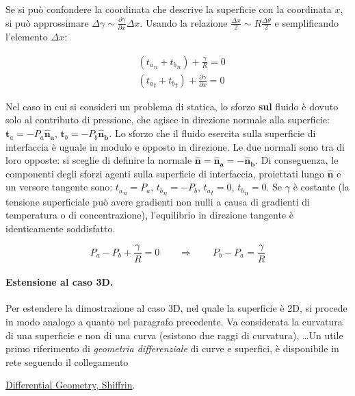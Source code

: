 Se si può confondere la coordinata che descrive la superficie con la coordinata $x$, si può 
approssimare $\Delta \gamma \sim \frac{\partial \gamma}{\partial x} \Delta x$.
Usando la relazione $\frac{\Delta x}{2} \sim R \frac{\Delta \theta}{2}$ e semplificando 
l'elemento $\Delta x$:

\begin{equation}\label{eqn:equil_young_laplace}
\begin{aligned}
 & ( {t_a}_n + {t_b}_n ) + \frac{\gamma}{R} = 0 \\
 & ( {t_a}_t + {t_b}_t ) + \frac{\partial \gamma}{\partial x} = 0
\end{aligned}
\end{equation}

Nel caso in cui si consideri un problema di statica, lo sforzo \textbf{sul} 
 fluido è dovuto solo al contributo di pressione, che agisce in direzione
 normale alla superficie: 
 $\bm{t}_a = -P_a \bm{\hat{n}_a}$,  $\bm{t}_b = -P_b \bm{\hat{n}_b}$. Lo
 sforzo che il fluido esercita sulla superficie di interfaccia è uguale
 in modulo e opposto in direzione. Le due
  normali sono tra di loro opposte: si sceglie di definire la normale
  $\bm{\hat{n}} = \bm{\hat{n}_a} = -\bm{\hat{n}_b}$. Di conseguenza, le
  componenti degli sforzi agenti sulla superficie di interfaccia, proiettati
  lungo $\bm{\hat{n}}$ e un versore tangente sono: ${{t_a}_n} = P_a$, 
  ${{t_b}_n} = - P_b$, ${{t_a}_t} = 0$, ${{t_b}_n} = 0$.
 Se $\gamma$ è costante (la tensione superficiale può avere gradienti non 
 nulli a causa di gradienti di temperatura o di concentrazione),
  l'equilibrio in direzione tangente è identicamente soddisfatto.

\begin{equation}
   P_a - P_b + \frac{\gamma}{R} = 0 \qquad 
  \Rightarrow  \qquad 
   P_b - P_a = \frac{\gamma}{R}
\end{equation}


\paragraph{Estensione al caso 3D.} Per estendere la dimostrazione al caso 3D, nel quale la superficie è 2D, si procede in modo analogo a quanto nel paragrafo precedente. Va considerata la curvatura di una superficie e non di una curva (esistono due raggi di curvatura), \dots Un utile primo riferimento di \textit{geometria differenziale} di curve e superfici, è disponibile in rete seguendo il collegamento

\vspace{0.3cm}
\noindent
\href{http://alpha.math.uga.edu/~shifrin/ShifrinDiffGeo.pdf}
 {Differential Geometry, Shiffrin}.

